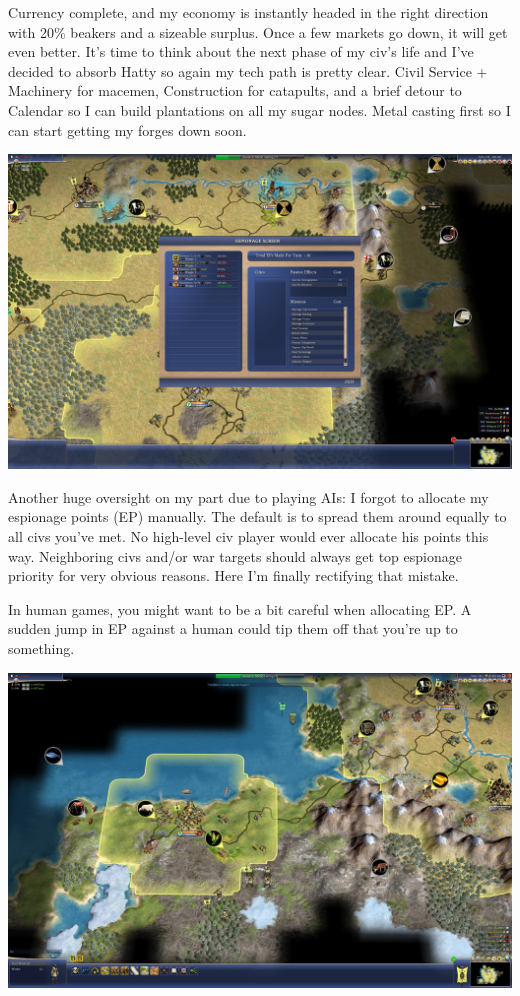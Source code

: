 \documentclass[10pt]{article}
\begin{document}
Currency complete, and my economy is instantly headed in the right direction with 20\% beakers and a sizeable surplus.
Once a few markets go down, it will get even better. It's time to think about the next phase of my civ's life and
I've decided to absorb Hatty so again my tech path is pretty clear. Civil Service + Machinery for macemen, Construction
for catapults, and a brief detour to Calendar so I can build plantations on all my sugar nodes. Metal casting first
so I can start getting my forges down soon.

\includegraphics[width=1.0\textwidth]{118}

Another huge oversight on my part due to playing AIs: I forgot to allocate my espionage points (EP) manually. The default
is to spread them around equally to all civs you've met. No high-level civ player would ever allocate his points
this way. Neighboring civs and/or war targets should always get top espionage priority for very obvious reasons.
Here I'm finally rectifying that mistake.

In human games, you might want to be a bit careful when allocating EP. A sudden jump in EP against a human could tip
them off that you're up to something.

\includegraphics[width=1.0\textwidth]{119}
\end{document}
